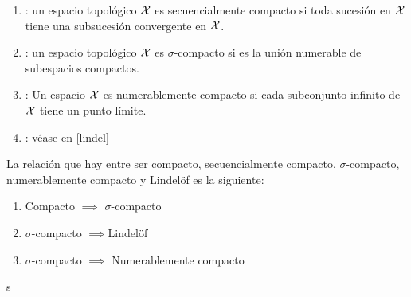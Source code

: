 \begin{defi}[Definiciones]
	\begin{enumerate}
		\item {}: un espacio topológico	$\mathcal{X}$ es secuencialmente compacto si toda sucesión en $\mathcal{X}$ tiene una subsucesión convergente en $\mathcal{X}$.
		\item {}:  un espacio topológico $\mathcal{X}$ es $\sigma$-compacto si es la unión numerable de subespacios compactos.
		\item {}: Un espacio $\mathcal{X}$ es numerablemente compacto si cada subconjunto infinito de $\mathcal{X}$ tiene un punto límite.
		\item {}: véase en \ref{lindel}
	\end{enumerate}
\end{defi}

\begin{obs}
	La relación que hay entre ser compacto, secuencialmente compacto, $\sigma$-compacto, numerablemente compacto y Lindelöf es la siguiente:
	\begin{enumerate}
		\item Compacto $\implies$ $\sigma$-compacto
		\item $\sigma$-compacto $\implies$Lindelöf
		\item $\sigma$-compacto $\implies$ Numerablemente compacto
	\end{enumerate}
\end{obs}
s
